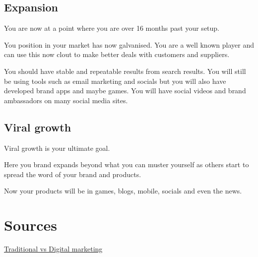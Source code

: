 \documentclass{article}
\begin{document}
\subsection{Expansion}
You are now at a point where you are over 16 months past your setup.

You position in your market has now galvanised. You are a well known player and can use this now clout to make better deals with customers and suppliers.

You should have stable and repeatable results from search results. You will still be using tools such as email marketing and socials but you will also have developed brand apps and maybe games. You will have social videos and brand ambassadors on many social media sites.

\subsection{Viral growth}
Viral growth is your ultimate goal.

Here you brand expands beyond what you can muster yourself as others start to spread the word of your brand and products.

Now your products will be in games, blogs, mobile, socials and even the news.



\break
\section{Sources}

\href{https://www.statista.com/statistics/693449/digital-vs-traditional-marketing-budget-change-according-to-cmos-usa/} {Traditional vs Digital marketing} \\
\end{document}
